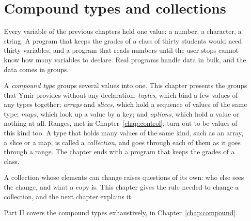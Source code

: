 \chapter{Compound types and collections}
\label{chap:collections}

Every variable of the previous chapters held one value: a number, a character,
a string. A program that keeps the grades of a class of thirty students would
need thirty variables, and a program that reads numbers until the user stops
cannot know how many variables to declare. Real programs handle data in bulk,
and the data comes in groups.

A \textit{compound type} groups several values into one. This chapter presents
the groups that Ymir provides without any declaration: \textit{tuples}, which
bind a few values of any types together; \textit{arrays} and \textit{slices},
which hold a sequence of values of the same type; \textit{maps}, which look up
a value by a key; and \textit{options}, which hold a value or nothing at all.
Ranges, met in Chapter~\ref{chap:control}, turn out to be values of this kind
too. A type that holds many values of the same kind, such as an array, a slice
or a map, is called a \textit{collection}, and  goes through each of
them as it goes through a range. The chapter ends with a program that keeps the
grades of a class.

A collection whose elements can change raises questions of its own: who else
sees the change, and what a copy is. This chapter gives the rule needed to
change a collection, and the next chapter explains it.

Part II covers the compound types exhaustively, in
Chapter~\ref{chap:compound}.

\minitoc%










